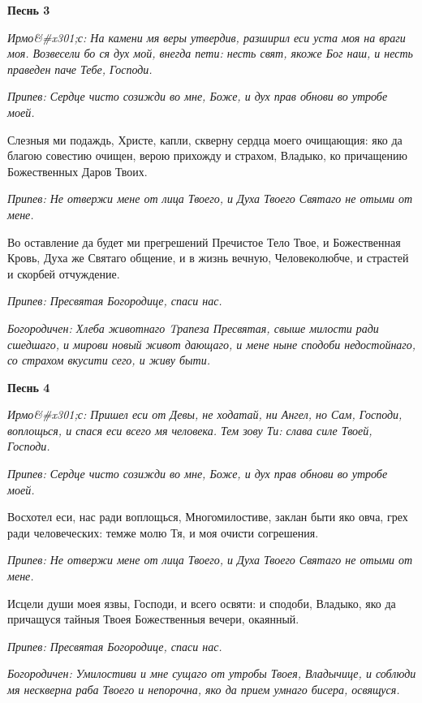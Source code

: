 \bfseries Песнь 3\normalfont{}


\itshape Ирмо&#x301;с:\normalfont{} На камени мя веры утвердив, разширил еси уста моя на враги моя. Возвесели бо ся дух мой, внегда пети: несть свят, якоже Бог наш, и несть праведен паче Тебе, Господи.


\itshape Припев: \normalfont{}Сердце чисто созижди во мне, Боже, и дух прав обнови во утробе моей.


Слезныя ми подаждь, Христе, капли, скверну сердца моего очищающия: яко да благою совестию очищен, верою прихожду и страхом, Владыко, ко причащению Божественных Даров Твоих.


\itshape Припев: \normalfont{}Не отвержи мене от лица Твоего, и Духа Твоего Святаго не отыми от мене.


Во оставление да будет ми прегрешений Пречистое Тело Твое, и Божественная Кровь, Духа же Святаго общение, и в жизнь вечную, Человеколюбче, и страстей и скорбей отчуждение.


\itshape Припев: \normalfont{}Пресвятая Богородице, спаси нас.


\itshape Богородичен: \normalfont{}Хлеба животнаго Tрапеза Пресвятая, свыше милости ради сшедшаго, и мирови новый живот дающаго, и мене ныне сподоби недостойнаго, со страхом вкусити сего, и живу быти.




\bfseries Песнь 4\normalfont{}


\itshape Ирмо&#x301;с:\normalfont{} Пришел еси от Девы, не ходатай, ни Ангел, но Сам, Господи, воплощься, и спася еси всего мя человека. Тем зову Ти: слава силе Твоей, Господи.


\itshape Припев: \normalfont{}Сердце чисто созижди во мне, Боже, и дух прав обнови во утробе моей.


Восхотел еси, нас ради воплощься, Многомилостиве, заклан быти яко овча, грех ради человеческих: темже молю Тя, и моя очисти согрешения.


\itshape Припев: \normalfont{}Не отвержи мене от лица Твоего, и Духа Твоего Святаго не отыми от мене.


Исцели души моея язвы, Господи, и всего освяти: и сподоби, Владыко, яко да причащуся тайныя Твоея Божественныя вечери, окаянный.


\itshape Припев: \normalfont{}Пресвятая Богородице, спаси нас.


\itshape Богородичен: \normalfont{}Умилостиви и мне сущаго от утробы Твоея, Владычице, и соблюди мя нескверна раба Твоего и непорочна, яко да прием умнаго бисера, освящуся.




